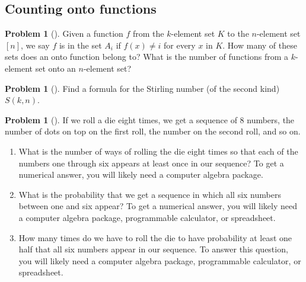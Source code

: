 \documentclass[10pt,]{book}
\theoremstyle{plain}
\theoremstyle{definition}
\newtheorem{activity}[project]{Problem}
\theoremstyle{definition}
\numberwithin{equation}{chapter}
\newcommand{\importantarrow}{\Rightarrow}
\begin{document}
\subsection[{Counting onto functions}]{Counting onto functions}\label{subsection-56}
\begin{activity}[] \label{numontofun}
Given a function \(f\) from the \(k\)-element set \(K\) to the \(n\)-element set \([n]\), we say \(f\) is in the set \(A_i\) if \(f(x)\not= i\) for every \(x\) in \(K\). How many of these  sets does an onto function belong to? What is the number of functions from a \(k\)-element set onto an \(n\)-element set?%
\end{activity}
\begin{activity}[]\marginsymbol[-1em]{\pdftooltip{$\importantarrow$}{especially interesting}} \label{activity-239}
Find a formula for the Stirling number (of the second kind) \(S(k,n)\).%
\end{activity}
\begin{activity}[]\marginsymbol[-1em]{} \label{activity-240}
If we roll a die eight times, we get a sequence of 8 numbers, the number of dots on top on the first roll, the number on the second roll, and so on.%
\begin{enumerate}[font=\bfseries,label=(\alph*),ref=\alph*]
\item\label{task-178} \marginsymbol[-2.5em]{} What is the number of ways of rolling the die eight times so that each of the numbers one through six appears at least once in our sequence? To get a numerical answer, you will likely need a computer algebra package.%
\item\label{task-179} \marginsymbol[-2.5em]{} What is the probability that we get a sequence in which all six numbers between one and six appear? To get a numerical answer, you will likely need a computer algebra package, programmable calculator, or spreadsheet.%
\item\label{task-180} \marginsymbol[-2.5em]{} How many times do we have to roll the die to have probability at least one half that all six numbers appear in our sequence. To answer this question, you will likely need a computer algebra package, programmable calculator, or spreadsheet.%
\end{enumerate}
\end{activity}
\typeout{************************************************}
\typeout{************************************************}
\end{document}
